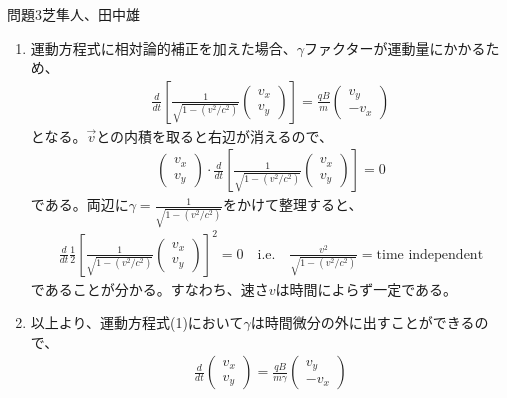 \documentclass[fleqn]{jbook}
\begin{document}
\begin{answer}{問題3}{芝隼人、田中雄}
\begin{enumerate}
\begin{eqnarray}
					  \end{eqnarray}
					  となり、時間の２乗に比例して増加することが分かる。
					  \item
					  運動方程式に相対論的補正を加えた場合、$\gamma$ファクターが運動量にかかるため、
					  \begin{eqnarray}
					      \frac{d}{dt}\left[ \frac{1}{\sqrt{1-(v^2/c^2 )}}\left( \begin{array}{c}{}
					      v_x \\ v_y \end{array}\right) \right]
=\frac{qB}{m}\left(\begin{array}{c}{}
v_y \\ -v_x \end{array}\right) 
\end{eqnarray}
となる。$\vec{v}$との内積を取ると右辺が消えるので、
\begin{eqnarray}
\left( \begin{array}{c}{}
v_x \\ v_y \end{array}\right) \cdot \frac{d}{dt}\left[ \frac{1}{\sqrt{1-(v^2/c^2)}} \left( \begin{array}{c}{}
v_x \\ v_y \end{array}\right) \right] =0
\end{eqnarray}
である。両辺に$\gamma = \frac{1}{\sqrt{ 1-(v^2/c^2) }}$をかけて整理すると、
\begin{eqnarray}
\frac{d}{dt} \frac{1}{2}\left[\frac{1}{\sqrt{1-(v^2/c^2)}}\left( \begin{array}{c}{}
v_x \\ v_y \end{array}\right)\right]^2 =0\quad \textrm{i.e.}\quad \frac{v^2}{\sqrt{1-(v^2/c^2)}}=\textrm{time independent}
\end{eqnarray}
であることが分かる。すなわち、速さ$v$は時間によらず一定である。
\item
以上より、運動方程式(1)において$\gamma$は時間微分の外に出すことができるので、
\begin{eqnarray}
\frac{d}{dt}\left( \begin{array}{c}{}
v_x \\ v_y \end{array}\right) =\frac{qB}{m\gamma}\left( \begin{array}{c}{}
v_y \\ -v_x \end{array}\right) 
\end{eqnarray}

\end{enumerate}
\end{answer}
\end{document}
